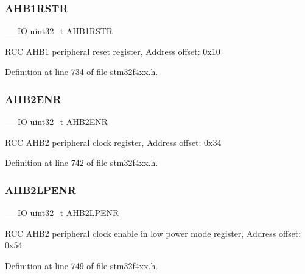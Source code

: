 \subsubsection{\texorpdfstring{A\+H\+B1\+R\+S\+TR}{AHB1RSTR}}
{\footnotesize\ttfamily \hyperlink{group___c_m_s_i_s__core__definitions_gaec43007d9998a0a0e01faede4133d6be}{\+\_\+\+\_\+\+IO} uint32\+\_\+t A\+H\+B1\+R\+S\+TR}

R\+CC A\+H\+B1 peripheral reset register, Address offset\+: 0x10 

Definition at line 734 of file stm32f4xx.\+h.

\mbox{\label{struct_r_c_c___type_def_a5e92ed32c33c92e7ebf6919400ad535b}} 
\subsubsection{\texorpdfstring{A\+H\+B2\+E\+NR}{AHB2ENR}}
{\footnotesize\ttfamily \hyperlink{group___c_m_s_i_s__core__definitions_gaec43007d9998a0a0e01faede4133d6be}{\+\_\+\+\_\+\+IO} uint32\+\_\+t A\+H\+B2\+E\+NR}

R\+CC A\+H\+B2 peripheral clock register, Address offset\+: 0x34 

Definition at line 742 of file stm32f4xx.\+h.

\mbox{\label{struct_r_c_c___type_def_a2b30982547fae7d545d260312771b5c9}} 
\subsubsection{\texorpdfstring{A\+H\+B2\+L\+P\+E\+NR}{AHB2LPENR}}
{\footnotesize\ttfamily \hyperlink{group___c_m_s_i_s__core__definitions_gaec43007d9998a0a0e01faede4133d6be}{\+\_\+\+\_\+\+IO} uint32\+\_\+t A\+H\+B2\+L\+P\+E\+NR}

R\+CC A\+H\+B2 peripheral clock enable in low power mode register, Address offset\+: 0x54 

Definition at line 749 of file stm32f4xx.\+h.

\mbox{\label{struct_r_c_c___type_def_a78a5aa9dd5694c48a7d8e66888a46450}} 
